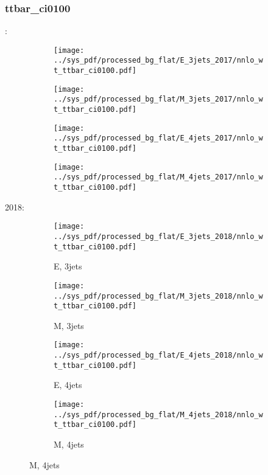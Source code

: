 \documentclass{beamer}
\begin{document}
\begin{frame}
\frametitle{ttbar_ci0100}
\fontsize{5}{1}:
\begin{figure}
\centering
\begin{subfigure}[b]{0.24\textwidth}
\texttt{[image: ../sys\_pdf/processed\_bg\_flat/E\_3jets\_2017/nnlo\_wt\_ttbar\_ci0100.pdf]}
\end{subfigure}
\begin{subfigure}[b]{0.24\textwidth}
\texttt{[image: ../sys\_pdf/processed\_bg\_flat/M\_3jets\_2017/nnlo\_wt\_ttbar\_ci0100.pdf]}
\end{subfigure}
\begin{subfigure}[b]{0.24\textwidth}
\texttt{[image: ../sys\_pdf/processed\_bg\_flat/E\_4jets\_2017/nnlo\_wt\_ttbar\_ci0100.pdf]}
\end{subfigure}
\begin{subfigure}[b]{0.24\textwidth}
\texttt{[image: ../sys\_pdf/processed\_bg\_flat/M\_4jets\_2017/nnlo\_wt\_ttbar\_ci0100.pdf]}
\end{subfigure}
\end{figure}
2018:
\begin{figure}
\centering
\begin{subfigure}[b]{0.24\textwidth}
\texttt{[image: ../sys\_pdf/processed\_bg\_flat/E\_3jets\_2018/nnlo\_wt\_ttbar\_ci0100.pdf]}
\captionsetup{font=tiny}
\caption{E, 3jets}
\end{subfigure}
\begin{subfigure}[b]{0.24\textwidth}
\texttt{[image: ../sys\_pdf/processed\_bg\_flat/M\_3jets\_2018/nnlo\_wt\_ttbar\_ci0100.pdf]}
\captionsetup{font=tiny}
\caption{M, 3jets}
\end{subfigure}
\begin{subfigure}[b]{0.24\textwidth}
\texttt{[image: ../sys\_pdf/processed\_bg\_flat/E\_4jets\_2018/nnlo\_wt\_ttbar\_ci0100.pdf]}
\captionsetup{font=tiny}
\caption{E, 4jets}
\end{subfigure}
\begin{subfigure}[b]{0.24\textwidth}
\texttt{[image: ../sys\_pdf/processed\_bg\_flat/M\_4jets\_2018/nnlo\_wt\_ttbar\_ci0100.pdf]}
\captionsetup{font=tiny}
\caption{M, 4jets}
\end{subfigure}
\end{figure}
\end{frame}
\end{document}

